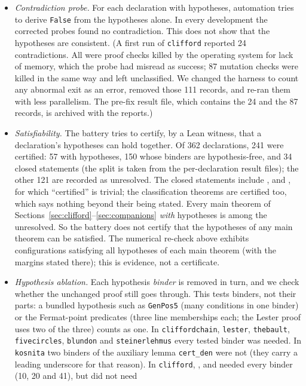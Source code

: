 \documentclass[11pt]{article}
\theoremstyle{definition}
\theoremstyle{remark}
\newcommand{\lean}[1]{\texttt{#1}}
\begin{document}
\begin{itemize}
\item \emph{Contradiction probe.} For each declaration with hypotheses, automation tries to derive
\lean{False} from the hypotheses alone. In every development the corrected probes found no
contradiction. This does not show that the hypotheses are consistent. (A first run of
\lean{clifford} reported 24 contradictions. All were proof checks killed by the operating system for
lack of memory, which the probe had misread as success; 87 mutation checks were killed in the same way
and left unclassified. We changed the harness to count any abnormal exit as an error, removed those
111 records, and re-ran them with less parallelism. The pre-fix result file, which contains the 24 and
the 87 records, is archived with the reports.)
\item \emph{Satisfiability.} The battery tries to certify, by a Lean witness, that a declaration's
hypotheses can hold together. Of 362 declarations, 241 were certified: 57 with hypotheses, 150 whose
binders are hypothesis-free, and 34 closed statements (the split is taken from the per-declaration
result files); the other 121 are recorded as unresolved. The closed statements include
,  and
, for which ``certified'' is trivial; the classification
theorems are certified too, which says nothing beyond their being stated. Every main theorem of
Sections~\ref{sec:clifford}--\ref{sec:companions} \emph{with} hypotheses is among the unresolved. So the battery does not
certify that the hypotheses of any main theorem can be satisfied. The numerical re-check above exhibits configurations satisfying all hypotheses of
each main theorem (with the margins stated there); this is evidence, not a certificate.
\item \emph{Hypothesis ablation.} Each hypothesis \emph{binder} is removed in turn, and we check whether
the unchanged proof still goes through. This tests binders, not their parts: a bundled hypothesis such
as \lean{GenPos5} (many conditions in one binder) or the Fermat-point predicates (three line
memberships each; the Lester proof uses two of the three) counts as one. In \lean{cliffordchain},
\lean{lester}, \lean{thebault}, \lean{fivecircles}, \lean{blundon} and \lean{steinerlehmus} every tested
binder was needed. In \lean{kosnita} two binders of the auxiliary lemma \lean{cert\_den} were not
(they carry a leading underscore for that reason). In \lean{clifford}, ,
 and  needed every binder (10, 20 and 41), but  did not need

\end{itemize}
\end{document}
